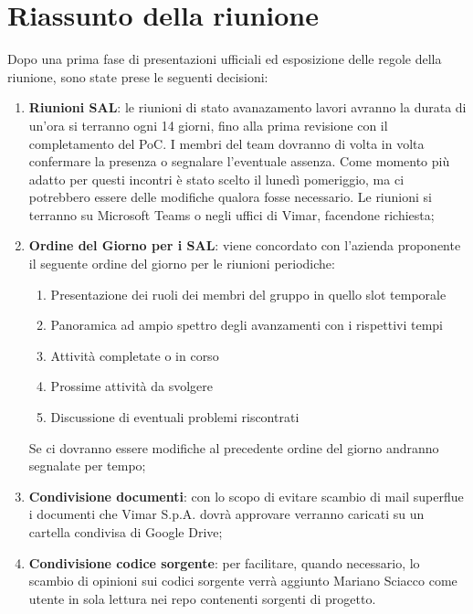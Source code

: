 \section{Riassunto della riunione}
Dopo una prima fase di presentazioni ufficiali ed esposizione delle regole della riunione, sono state prese le seguenti decisioni:
\begin{enumerate}
    \item \textbf{Riunioni SAL}: le riunioni di stato avanazamento lavori avranno la durata di un'ora si terranno ogni 14 giorni, fino alla prima revisione con il completamento del PoC. I membri del team dovranno di volta in volta confermare la presenza o segnalare l'eventuale assenza. Come momento più adatto per questi incontri è stato scelto il lunedì pomeriggio, ma ci potrebbero essere delle modifiche qualora fosse necessario. Le riunioni si terranno su Microsoft Teams o negli uffici di Vimar, facendone richiesta;
    
    \item \textbf{Ordine del Giorno per i SAL}: viene concordato con l'azienda proponente il seguente ordine del giorno per le riunioni periodiche:
        \begin{enumerate}[label=\Roman* - ]
            \item Presentazione dei ruoli dei membri del gruppo in quello slot temporale
            \item Panoramica ad ampio spettro degli avanzamenti con i rispettivi tempi
            \item Attività completate o in corso 
            \item Prossime attività da svolgere
            \item Discussione di eventuali problemi riscontrati
        \end{enumerate}
    Se ci dovranno essere modifiche al precedente ordine del giorno andranno segnalate per tempo;

    \item \textbf{Condivisione documenti}: con lo scopo di evitare scambio di mail superflue i documenti che Vimar S.p.A. dovrà approvare verranno caricati su un cartella condivisa di Google Drive;

    \item \textbf{Condivisione codice sorgente}: per facilitare, quando necessario, lo scambio di opinioni sui codici sorgente verrà aggiunto Mariano Sciacco come utente in sola lettura nei repo contenenti sorgenti di progetto.

\end{enumerate}

